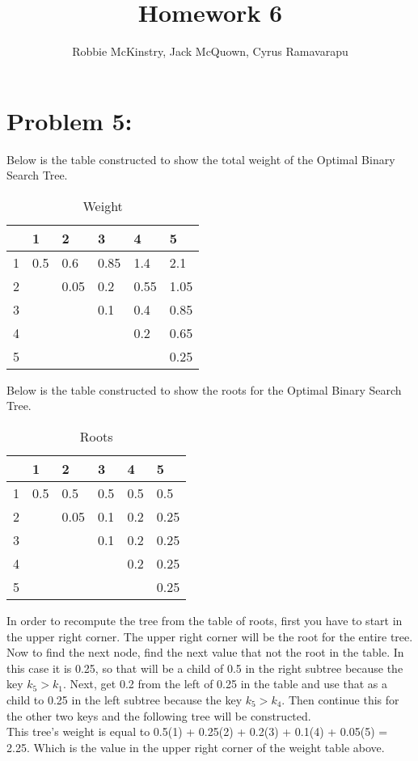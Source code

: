 \documentclass[12pt]{article}
\begin{document}
\title{Homework 6}
\author{Robbie McKinstry, Jack McQuown, Cyrus Ramavarapu}
\renewcommand{\today}{15 September 2016}
\renewcommand{\baselinestretch}{1.5}
\maketitle

\section*{Problem 5: }
Below is the table constructed to show the total weight of the Optimal Binary Search Tree.
\begin{table}[H]
\centering
\caption{Weight}
\label{my-label}
\begin{tabular}{l|lllll}
  & 1   & 2    & 3    & 4    & 5    \\ \hline
1 & 0.5 & 0.6  & 0.85 & 1.4  & 2.1  \\
2 &     & 0.05 & 0.2  & 0.55 & 1.05 \\
3 &     &      & 0.1  & 0.4  & 0.85 \\
4 &     &      &      & 0.2  & 0.65 \\
5 &     &      &      &      & 0.25\\
\end{tabular}
\end{table}
Below is the table constructed to show the roots for the Optimal Binary Search Tree.
\begin{table}[H]
\centering
\caption{Roots}
\label{my-label}
\begin{tabular}{l|lllll}
  & 1   & 2    & 3   & 4   & 5    \\ \hline
1 & 0.5 & 0.5  & 0.5 & 0.5 & 0.5  \\
2 &     & 0.05 & 0.1 & 0.2 & 0.25 \\
3 &     &      & 0.1 & 0.2 & 0.25 \\
4 &     &      &     & 0.2 & 0.25 \\
5 &     &      &     &     & 0.25
\end{tabular}
\end{table}
In order to recompute the tree from the table of roots, first you have to start in the upper right corner. The upper right corner will be the root for the entire tree. Now to find the next node, find the next value that not the root in the table. In this case it is 0.25, so that will be a child of 0.5 in the right subtree because the key {$k_5 > k_1$}. Next, get 0.2 from the left of 0.25 in the table and use that as a child to 0.25 in the left subtree because the key {$k_5 > k_4$}. Then continue this for the other two keys and the following tree will be constructed.\\ This tree's weight is equal to 0.5(1) + 0.25(2) + 0.2(3) + 0.1(4) + 0.05(5) = 2.25. Which is the value in the upper right corner of the weight table above.\\\\
\end{document}
